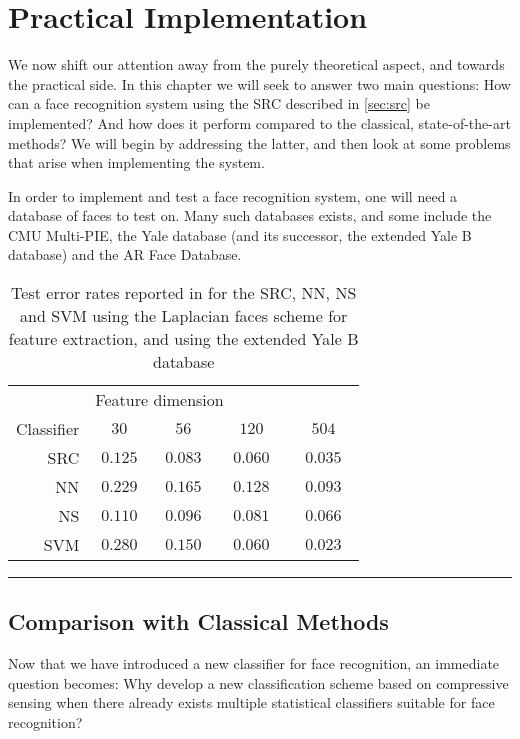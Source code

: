 \chapter{Practical Implementation}
We now shift our attention away from the purely theoretical aspect, and towards the practical side. In this chapter we will seek to answer two main questions: How can a face recognition system using the SRC described in \cref{sec:src} be implemented? And how does it perform compared to the classical, state-of-the-art methods? We will begin by addressing the latter, and then look at some problems that arise when implementing the system.

In order to implement and test a face recognition system, one will need a database of faces to test on. Many such databases exists, and some include the CMU Multi-PIE, the Yale database (and its successor, the extended Yale B database) and the AR Face Database. 
\begin{table*}[t]
	\centering
	\renewcommand{\arraystretch}{1.2}
	\begin{tabular}{r | c c c c}
		& \multicolumn{4}{l}{\quad Feature dimension}                                 \\
		Classifier & $ \quad30\quad $ & $ \quad56\quad $ & $ \quad120\quad $ & $ \quad504\quad $ \\ \hline
		SRC & $ 0.125 $        & $ 0.083 $        & $ 0.060 $         & $ 0.035 $         \\
		NN & $ 0.229 $        & $ 0.165 $        & $ 0.128 $         & $ 0.093 $         \\
		NS & $ 0.110 $        & $ 0.096 $        & $ 0.081 $         & $ 0.066 $         \\
		SVM & $ 0.280 $        & $  0.150 $       & $ 0.060 $         & $ 0.023 $
	\end{tabular}
	\renewcommand{\arraystretch}{1}
	\caption{Test error rates reported in \cite{wright09facerecog} for the SRC, NN, NS and SVM using the Laplacian faces scheme for feature extraction, and using the extended Yale B database}
	\label{table:errorrates}
	\vspace{4pt}\hrule
\end{table*}

\section{Comparison with Classical Methods}
Now that we have introduced a new classifier for face recognition, an immediate question becomes: Why develop a new classification scheme based on compressive sensing when there already exists multiple statistical classifiers suitable for face recognition? 

